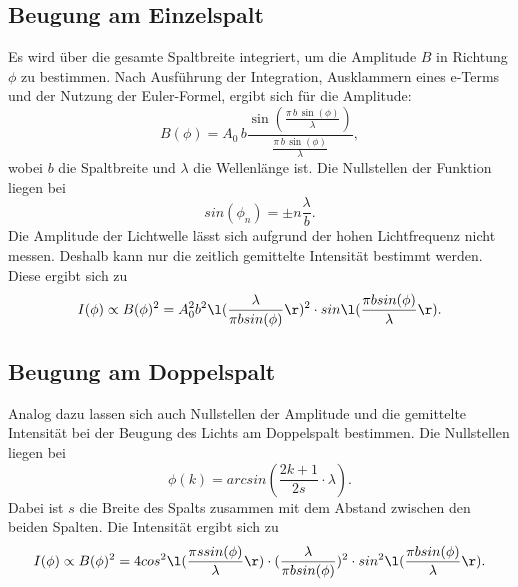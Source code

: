 \subsection{Beugung am Einzelspalt}
Es wird über die gesamte Spaltbreite integriert, um die 
Amplitude $B$ in Richtung $\phi$ zu bestimmen. Nach Ausführung 
der Integration, Ausklammern eines e-Terms und der Nutzung 
der Euler-Formel, ergibt sich für die Amplitude:
\begin{equation*}
    B(\phi) = A_0 \, b \frac{\sin(\frac{\pi \, b \, \sin(\phi)}{\lambda})}{\frac{\pi \, b \, \sin(\phi)}{\lambda}},
\end{equation*}
wobei $b$ die Spaltbreite und $\lambda$ 
die Wellenlänge ist. 
Die Nullstellen der Funktion liegen bei
\begin{equation} 
    sin(\phi_n)= \pm n \frac{\lambda}{b}.
    \label{eqn:nullstellen}
\end{equation}
Die Amplitude der Lichtwelle lässt sich aufgrund der hohen 
Lichtfrequenz nicht messen. Deshalb kann nur die zeitlich 
gemittelte Intensität bestimmt werden. 
\newline
Diese ergibt sich zu 
\begin{equation}
    I(\phi) \propto B(\phi)^2 = A^{2}_0 b^2 \l(\frac{\lambda}{\pi b sin(\phi)} \r)^2 \cdot sin \l(\frac{\pi b sin(\phi)}{\lambda}\r).
    \label{eqn:intensität}
\end{equation}

\subsection{Beugung am Doppelspalt}
Analog dazu lassen sich auch Nullstellen der Amplitude und 
die gemittelte Intensität bei der Beugung des Lichts am 
Doppelspalt bestimmen.
Die Nullstellen liegen bei 
\begin{equation}
    \phi(k) = arcsin(\frac{2k+1}{2s}\cdot \lambda).
    \label{eqn:doppelns}
\end{equation}
Dabei ist $s$ die Breite des Spalts zusammen mit
dem Abstand zwischen den beiden Spalten. 
\newline
Die Intensität ergibt sich zu 
\begin{equation}
    I(\phi) \propto B(\phi)^2 =4 cos^2\l(\frac{\pi s sin(\phi)}{\lambda} \r)\cdot(\frac{\lambda}{\pi b sin(\phi)})^2 \cdot sin^2 \l(\frac{\pi b sin(\phi)}{\lambda}\r).
    \label{eqn:doppelintensität}
\end{equation}


